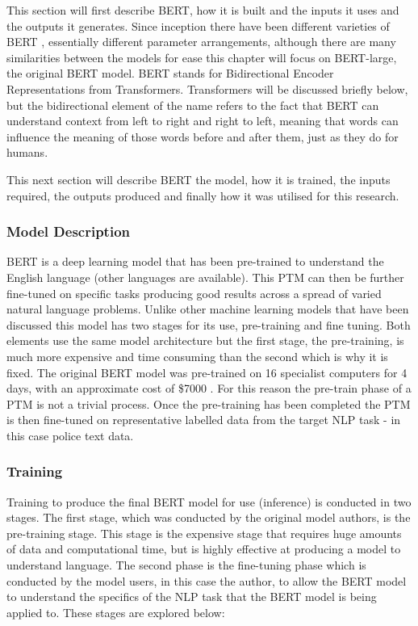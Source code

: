 This section will first describe BERT, how it is built and the inputs it uses and the outputs it generates. Since inception there have been different varieties of BERT \parencite{rogers2020primer}, essentially different parameter arrangements, although there are many similarities between the models for ease this chapter will focus on BERT-large, the original BERT model. BERT stands for Bidirectional Encoder Representations from Transformers. Transformers will be discussed briefly below, but the bidirectional element of the name refers to the fact that BERT can understand context from left to right and right to left, meaning that words can influence the meaning of those words before and after them, just as they do for humans.

This next section will describe BERT the model, how it is trained, the inputs required, the outputs produced and finally how it was utilised for this research.

\subsubsection{Model Description} BERT is a deep learning model that has been pre-trained to understand the English language (other languages are available). This PTM can then be further fine-tuned on specific tasks producing good results across a spread of varied natural language problems. Unlike other machine learning models that have been discussed this model has two stages for its use, pre-training and fine tuning. Both elements use the same model architecture but the first stage, the pre-training, is much more expensive and time consuming than the second which is why it is fixed. The original BERT model was pre-trained on 16 specialist computers for 4 days, with an approximate cost of \$7000 \parencite{devlin2018bert}. For this reason the pre-train phase of a PTM is not a trivial process. Once the pre-training has been completed the PTM is then fine-tuned on representative labelled data from the target NLP task - in this case police text data.

\subsubsection{Training} Training to produce the final BERT model for use (inference) is conducted in two stages. The first stage, which was conducted by the original model authors, is the pre-training stage. This stage is the expensive stage that requires huge amounts of data and computational time, but is highly effective at producing a model to understand language. The second phase is the fine-tuning phase which is conducted by the model users, in this case the author, to allow the BERT model to understand the specifics of the NLP task that the BERT model is being applied to. These stages are explored below: 

